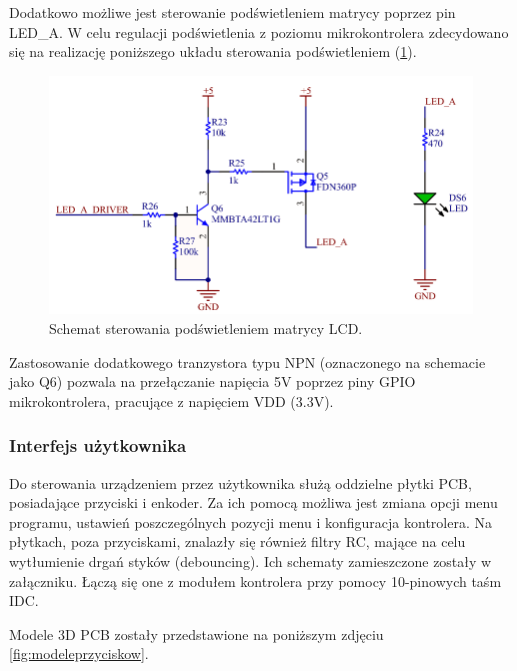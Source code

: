 Dodatkowo możliwe jest sterowanie podświetleniem matrycy poprzez pin LED\_A. W celu regulacji podświetlenia z poziomu mikrokontrolera 
zdecydowano się na realizację poniższego układu sterowania podświetleniem (\ref{fig:sterowaniePodswietleniem}).

\begin{figure}[h!]
    \begin{center}
        \includegraphics[width = 17cm]{images/sterowaniePodswietleniem_2.png}
        \caption{Schemat sterowania podświetleniem matrycy LCD.}
        \label{fig:sterowaniePodswietleniem}
    \end{center}
\end{figure}

Zastosowanie dodatkowego tranzystora typu NPN (oznaczonego na schemacie jako Q6) pozwala na przełączanie napięcia 5V poprzez piny GPIO mikrokontrolera, pracujące z napięciem VDD (3.3V).



\subsubsection{Interfejs użytkownika}

Do sterowania urządzeniem przez użytkownika służą oddzielne płytki PCB, 
posiadające przyciski i enkoder. Za ich pomocą możliwa jest zmiana opcji 
menu programu, ustawień poszczególnych pozycji menu i konfiguracja kontrolera. 
Na płytkach, poza przyciskami, znalazły się również filtry RC, mające na celu
wytłumienie drgań styków (debouncing). Ich schematy zamieszczone zostały w 
załączniku. Łączą się one z modułem kontrolera przy pomocy 10-pinowych 
taśm IDC.

Modele 3D PCB zostały przedstawione na poniższym zdjęciu \ref{fig:modeleprzyciskow}.


